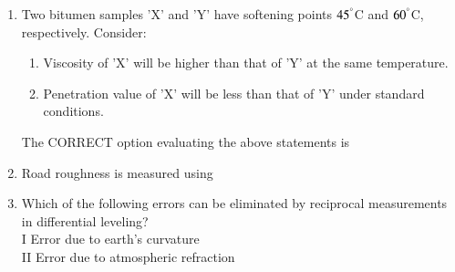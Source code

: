 \documentclass[journal]{IEEEtran}
\begin{document}
\begin{enumerate}
\item Two bitumen samples 'X' and 'Y' have softening points $45^\degree$C and $60^\degree$C, respectively. Consider: \hfill {}
\begin{enumerate}
\item Viscosity of 'X' will be higher than that of 'Y' at the same temperature.
\item Penetration value of 'X' will be less than that of 'Y' under standard conditions.
\end{enumerate}
The CORRECT option evaluating the above statements is
\begin{enumerate}
\end{enumerate}

\item Road roughness is measured using \hfill {}
\begin{enumerate}
\end{enumerate}



\item Which of the following errors can be eliminated by reciprocal measurements in differential leveling?\\
I Error due to earth's curvature\\
II Error due to atmospheric refraction \hfill {}
\begin{enumerate}
\end{enumerate}



\end{enumerate}
\end{document}
